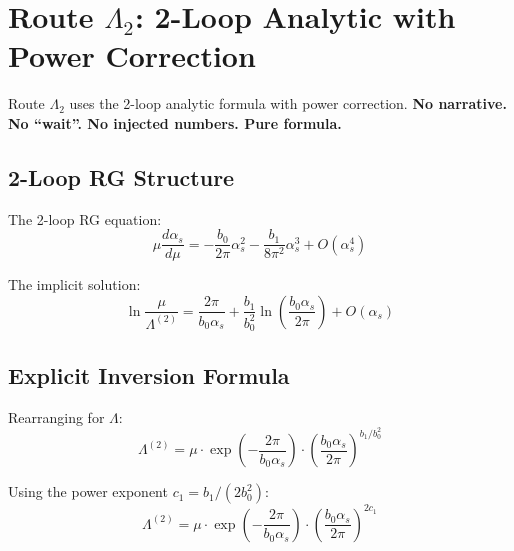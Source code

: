 \documentclass[11pt,a4paper]{article}
\theoremstyle{definition}
\begin{document}
\section{Route $\Lambda_2$: 2-Loop Analytic with Power Correction}
\label{sec:route-lambda2}

\begin{lambdabox}
Route $\Lambda_2$ uses the 2-loop analytic formula with power correction.
\textbf{No narrative. No ``wait''. No injected numbers. Pure formula.}
\end{lambdabox}

\subsection{2-Loop RG Structure}
\label{subsec:2loop-rg}

The 2-loop RG equation:
\begin{equation}
\label{eq:rge-2loop}
\mu\frac{d\alpha_s}{d\mu} = -\frac{b_0}{2\pi}\alpha_s^2
  - \frac{b_1}{8\pi^2}\alpha_s^3 + O(\alpha_s^4)
\end{equation}

The implicit solution:
\begin{equation}
\label{eq:2loop-implicit}
\ln\frac{\mu}{\Lambda^{(2)}} = \frac{2\pi}{b_0\alpha_s}
  + \frac{b_1}{b_0^2}\ln\left(\frac{b_0\alpha_s}{2\pi}\right) + O(\alpha_s)
\end{equation}

\subsection{Explicit Inversion Formula}
\label{subsec:lambda2-inversion}

Rearranging for $\Lambda$:
\begin{equation}
\label{eq:lambda2-rearrange}
\Lambda^{(2)} = \mu \cdot \exp\left(-\frac{2\pi}{b_0\alpha_s}\right)
  \cdot \left(\frac{b_0\alpha_s}{2\pi}\right)^{b_1/b_0^2}
\end{equation}

Using the power exponent $c_1 = b_1/(2b_0^2)$:
\begin{equation}
\label{eq:lambda2-c1-form}
\Lambda^{(2)} = \mu \cdot \exp\left(-\frac{2\pi}{b_0\alpha_s}\right)
  \cdot \left(\frac{b_0\alpha_s}{2\pi}\right)^{2c_1}
\end{equation}
\end{document}

